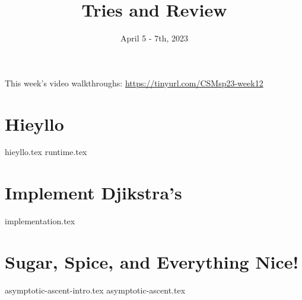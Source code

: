 \documentclass[11pt]{exam}
\title{Tries and Review}
\date{April 5 - 7th, 2023}
\begin{document}
\maketitle
This week's video walkthroughs:
\href{https://tinyurl.com/CSMsp23-week12}{https://tinyurl.com/CSMsp23-week12}


\section{Hieyllo}
\begin{questions}
{hieyllo.tex}
{runtime.tex}
\end{questions}

\pagebreak

\section{Implement Djikstra's}
\begin{questions}
{implementation.tex}
\end{questions}

% 
\pagebreak
\section{Sugar, Spice, and Everything Nice!}
\begin{questions}
{asymptotic-ascent-intro.tex}
{asymptotic-ascent.tex}
\end{questions}

% 
\end{document}
